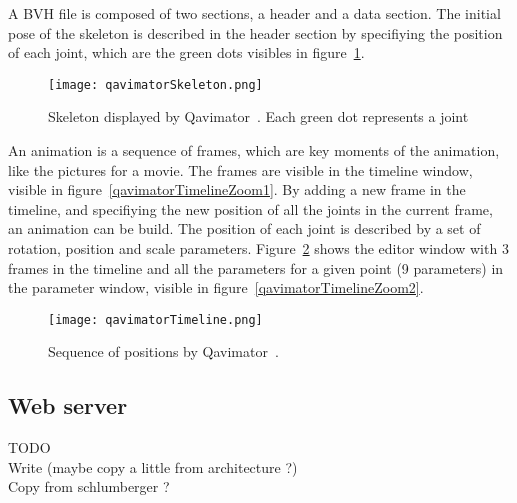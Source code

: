 A BVH file is composed of two sections, a header and a data section. The initial pose of the skeleton is described in the header section by specifiying the position of each joint, which are the green dots visibles in figure~\ref{qavimatorSkeleton}. \\

\begin{figure}[h]
  \caption{Skeleton displayed by Qavimator~\cite{qavimatorWebsite}. Each green dot represents a joint}
  \centering
  \texttt{[image: qavimatorSkeleton.png]}
  \label{qavimatorSkeleton}
\end{figure}

An animation is a sequence of frames, which are key moments of the animation, like the pictures for a movie. The frames are visible in the timeline window, visible in figure~\ref{qavimatorTimelineZoom1}.
By adding a new frame in the timeline, and specifiying the new position of all the joints in the current frame, an animation can be build. The position of each joint is described by a set of rotation, position and scale parameters. Figure~\ref{qavimatorTimeline} shows the editor window with 3 frames in the timeline and all the parameters for a given point (9 parameters) in the parameter window, visible in figure~\ref{qavimatorTimelineZoom2}.

\begin{figure}[h]
  \caption{Sequence of positions by Qavimator~\cite{qavimatorWebsite}. }
  \centering
  \texttt{[image: qavimatorTimeline.png]}
  \label{qavimatorTimeline}
\end{figure}



\subsection{Web server}
TODO \\
Write (maybe copy a little from architecture ?)\\
Copy from schlumberger ?